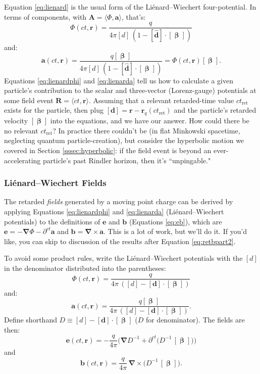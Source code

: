 \documentclass[12pt]{article}
\renewcommand{\vv}[1]{\mathbf{#1}}
\newcommand{\vvbeta}{\bm{\upbeta}}
\newcommand{\del}{\boldsymbol{\nabla}}
\begin{document}
Equation \ref{eq:lienard} is the usual form of the Li\'enard--Wiechert four-potential. In terms of components, with $\vv A = \langle \Phi, \vv a \rangle$, that's:
\begin{equation}\label{eq:lienardphi}
\Phi(ct, \vv r) = \dfrac{q}{4 \pi [d] \, (1 - [\vv{\hat{d}}] \cdot [\vvbeta] )}
\end{equation}
and:
\begin{equation}\label{eq:lienarda}
\vv a(ct, \vv r) = \dfrac{q [\vvbeta]}{4 \pi [d] \, (1 - [\vv{\hat{d}}] \cdot [\vvbeta] )} = \Phi(ct, \vv r) [ \vvbeta ] .
\end{equation}
Equations \ref{eq:lienardphi} and \ref{eq:lienarda} tell us how to calculate a given particle's contribution to the scalar and three-vector (Lorenz-gauge) potentials at some field event $\vv R = \langle ct, \vv r \rangle$. Assuming that a relevant retarded-time value $ct_{\textrm{ret}}$ exists for the particle, then plug $[ \vv d ] = \vv r - \vv r_{q} (ct_{\textrm{ret}})$ and the particle's retarded velocity $[\vvbeta]$ into the equations, and we have our answer. How could there be no relevant $ct_{\textrm{ret}}$? In practice there couldn't be (in flat Minkowski spacetime, neglecting quantum particle-creation), but consider the hyperbolic motion we covered in Section \ref{sssec:hyperbolic}: if the field event is beyond an ever-accelerating particle's past Rindler horizon, then it's ``unpingable."


\subsubsection{Li\'enard--Wiechert Fields}\label{sssec:lwf}

The retarded \emph{fields} generated by a moving point charge can be derived by applying Equations \ref{eq:lienardphi} and \ref{eq:lienarda} (Li\'enard--Wiechert potentials) to the definitions of $\vv e$ and $\vv b$ (Equations \ref{eq:eb}), which are $\vv e = - \del \Phi - \partial^{ct} \vv a$ and $\vv b = \del \times \vv a$. This is a lot of work, but we'll do it. If you'd like, you can skip to discussion of the results after Equation \ref{eq:retbpart2}.

To avoid some product rules, write the Li\'enard--Wiechert potentials with the $[d]$ in the denominator distributed into the parentheses:
\begin{equation*}
\Phi(ct, \vv r) = \dfrac{q}{4 \pi \, ([d] - [\vv{d}] \cdot [\vvbeta] )}
\end{equation*}
and:
\begin{equation*}
\vv a(ct, \vv r) = \dfrac{q [\vvbeta]}{4 \pi \, ([d] - [\vv{d}] \cdot [\vvbeta] )} .
\end{equation*}
Define shorthand $D \equiv [d] - [\vv d] \cdot [\vvbeta]$ ($D$ for denominator). The fields are then:
\begin{equation}\label{eq:lwe0}
\vv e (ct, \vv r) = - \dfrac{q}{4 \pi} \Big( \del D^{-1} + \partial^{ct} \big( D^{-1} \, [\vvbeta] \big) \Big)
\end{equation}
and
\begin{equation}\label{eq:lwb0}
\vv b (ct, \vv r) = \dfrac{q}{4 \pi} \, \del \times \big( D^{-1} \, [\vvbeta] \big) .
\end{equation}
\end{document}
